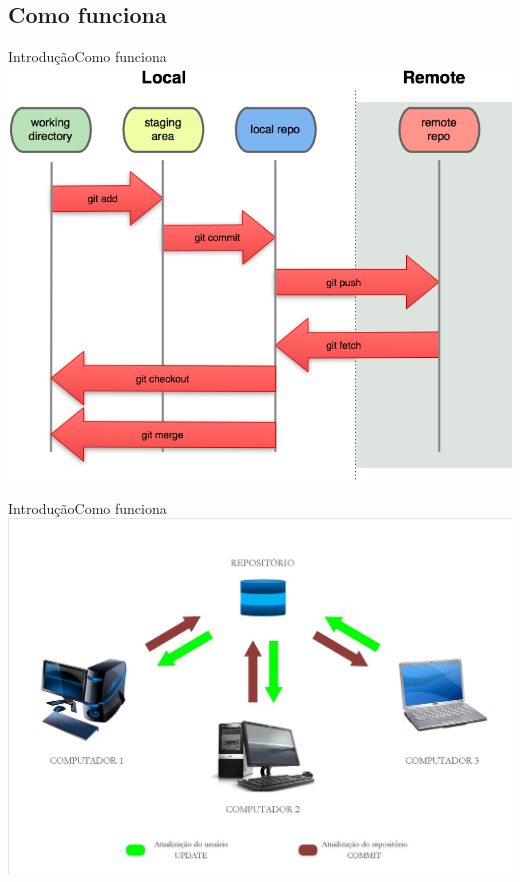 \documentclass[10pt]{beamer}
\begin{document}
\subsection{Como funciona}
\begin{frame}{Introdução}{Como funciona}
	\includegraphics[scale=0.75]{AAUgraphics/funcionamento.png}  
\end{frame}
\begin{frame}{Introdução}{Como funciona}
	\includegraphics[scale=0.17]{AAUgraphics/esquema2}  
\end{frame}

\end{document}
